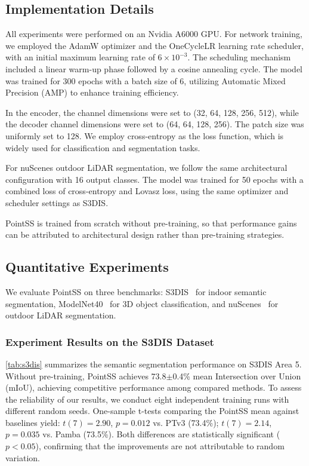 \documentclass[a4paper,fleqn]{cas-sc}
\begin{document}
\subsection{Implementation Details}

All experiments were performed on an Nvidia A6000 GPU. For network training, we employed the AdamW optimizer and the OneCycleLR learning rate scheduler, with an initial maximum learning rate of $6 \times 10^{-3}$. The scheduling mechanism included a linear warm-up phase followed by a cosine annealing cycle. The model was trained for 300 epochs with a batch size of 6, utilizing Automatic Mixed Precision (AMP) to enhance training efficiency.

In the encoder, the channel dimensions were set to (32, 64, 128, 256, 512), while the decoder channel dimensions were set to (64, 64, 128, 256). The patch size was uniformly set to 128. We employ cross-entropy as the loss function, which is widely used for classification and segmentation tasks.

For nuScenes outdoor LiDAR segmentation, we follow the same architectural configuration with 16 output classes. The model was trained for 50 epochs with a combined loss of cross-entropy and Lovasz loss, using the same optimizer and scheduler settings as S3DIS.

PointSS is trained from scratch without pre-training, so that performance gains can be attributed to architectural design rather than pre-training strategies.

\subsection{Quantitative Experiments}

We evaluate PointSS on three benchmarks: S3DIS~\cite{s3dis} for indoor semantic segmentation, ModelNet40~\cite{ModelNet40} for 3D object classification, and nuScenes~\cite{nuscenes} for outdoor LiDAR segmentation.

\subsubsection{Experiment Results on the S3DIS Dataset}

\cref{tab:s3dis} summarizes the semantic segmentation performance on S3DIS Area 5. Without pre-training, PointSS achieves 73.8$\pm$0.4\% mean Intersection over Union (mIoU), achieving competitive performance among compared methods. To assess the reliability of our results, we conduct eight independent training runs with different random seeds. One-sample t-tests comparing the PointSS mean against baselines yield: $t(7)=2.90$, $p=0.012$ vs. PTv3 (73.4\%); $t(7)=2.14$, $p=0.035$ vs. Pamba (73.5\%). Both differences are statistically significant ($p<0.05$), confirming that the improvements are not attributable to random variation.
\end{document}
